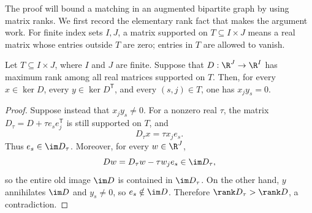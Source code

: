 The proof will bound a matching in an augmented bipartite graph by using
matrix ranks.  We first record the elementary rank fact that makes the
argument work.  For finite index sets $I,J$, a matrix supported on
$T\subseteq I\times J$ means a real matrix whose entries outside $T$ are
zero; entries in $T$ are allowed to vanish.

\begin{lemma}\label{lem:kernel-support}
Let $T\subseteq I\times J$, where $I$ and $J$ are finite.  Suppose that
$D:\R^J\to\R^I$ has maximum rank among all real matrices supported on $T$.
Then, for every $x\in\ker D$, every $y\in\ker D^{\mathsf T}$, and every
$(s,j)\in T$, one has $x_jy_s=0$.
\end{lemma}

\begin{proof}
Suppose instead that $x_jy_s\ne0$.  For a nonzero real $\tau$, the matrix
$D_\tau=D+\tau e_s e_j^{\mathsf T}$ is still supported on $T$, and
\[
 D_\tau x=\tau x_j e_s.
\]
Thus $e_s\in\im D_\tau$.  Moreover, for every $w\in\R^J$,
\[
 Dw=D_\tau w-\tau w_j e_s\in\im D_\tau,
\]
so the entire old image $\im D$ is contained in $\im D_\tau$.
On the other hand, $y$ annihilates $\im D$ and $y_s\ne0$, so
$e_s\notin\im D$.  Therefore $\rank D_\tau>\rank D$, a contradiction.
\end{proof}
